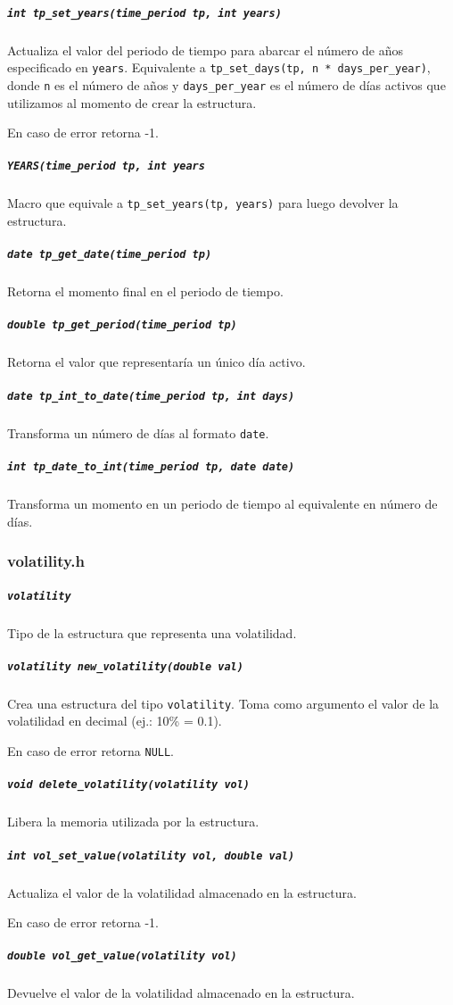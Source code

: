 \documentclass[12pt,a4paper,final]{article}
\begin{document}
			\subparagraph{\texttt{int tp\_set\_years(time\_period tp, int years)}}
				Actualiza el valor del periodo de tiempo para abarcar el número de años
				especificado en \texttt{years}. Equivalente a 
				\texttt{tp\_set\_days(tp, n * days\_per\_year)}, donde \texttt{n}
				es el número de años y \texttt{days\_per\_year} es el número de días
				activos que utilizamos al momento de crear la estructura.
				
				En caso de error retorna -1.
				
			\subparagraph{\texttt{YEARS(time\_period tp, int years}}
				Macro que equivale a \texttt{tp\_set\_years(tp, years)} para luego devolver
				la estructura.
				
			\subparagraph{\texttt{date tp\_get\_date(time\_period tp)}}
				Retorna el momento final en el periodo de tiempo.
				
			\subparagraph{\texttt{double tp\_get\_period(time\_period tp)}}
				Retorna el valor que representaría un único día activo.
			
			\subparagraph{\texttt{date tp\_int\_to\_date(time\_period tp, int days)}}
				Transforma un número de días al formato \texttt{date}.
				
			\subparagraph{\texttt{int tp\_date\_to\_int(time\_period tp, date date)}}
				Transforma un momento en un periodo de tiempo al equivalente en número de días.
			
		\subsubsection{volatility.h}

			\subparagraph{\texttt{volatility}}
				Tipo de la estructura que representa una volatilidad.
				
			\subparagraph{\texttt{volatility new\_volatility(double val)}}
				Crea una estructura del tipo \texttt{volatility}. Toma como argumento
				el valor de la volatilidad en decimal (ej.: 10\% = 0.1).
				
				En caso de error retorna \texttt{NULL}.
				
			\subparagraph{\texttt{void delete\_volatility(volatility vol)}}
				Libera la memoria utilizada por la estructura.
				
			\subparagraph{\texttt{int vol\_set\_value(volatility vol, double val)}}
				Actualiza el valor de la volatilidad almacenado en la estructura.
				
				En caso de error retorna -1.
				
			\subparagraph{\texttt{double vol\_get\_value(volatility vol)}}
				Devuelve el valor de la volatilidad almacenado en la estructura.			
			
\end{document}
